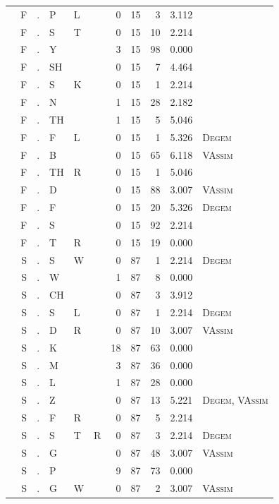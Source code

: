 \documentclass[12pt]{article}
\begin{document}
\begin{longtable}{r@{ } r@{ } c@{ } l@{ } l@{ } l@{ } r r r r l }
 & F & . & P & L &  & 0 & 15 & 3 & 3.112 &  \\
 & F & . & S & T &  & 0 & 15 & 10 & 2.214 &  \\
 & F & . & Y &  &  & 3 & 15 & 98 & 0.000 &  \\
 & F & . & SH &  &  & 0 & 15 & 7 & 4.464 &  \\
 & F & . & S & K &  & 0 & 15 & 1 & 2.214 &  \\
 & F & . & N &  &  & 1 & 15 & 28 & 2.182 &  \\
 & F & . & TH &  &  & 1 & 15 & 5 & 5.046 &  \\
 & F & . & F & L &  & 0 & 15 & 1 & 5.326 & \textsc{Degem} \\
 & F & . & B &  &  & 0 & 15 & 65 & 6.118 & \textsc{VAssim} \\
 & F & . & TH & R &  & 0 & 15 & 1 & 5.046 &  \\
 & F & . & D &  &  & 0 & 15 & 88 & 3.007 & \textsc{VAssim} \\
 & F & . & F &  &  & 0 & 15 & 20 & 5.326 & \textsc{Degem} \\
 & F & . & S &  &  & 0 & 15 & 92 & 2.214 &  \\
 & F & . & T & R &  & 0 & 15 & 19 & 0.000 &  \\
 & S & . & S & W &  & 0 & 87 & 1 & 2.214 & \textsc{Degem} \\
 & S & . & W &  &  & 1 & 87 & 8 & 0.000 &  \\
 & S & . & CH &  &  & 0 & 87 & 3 & 3.912 &  \\
 & S & . & S & L &  & 0 & 87 & 1 & 2.214 & \textsc{Degem} \\
 & S & . & D & R &  & 0 & 87 & 10 & 3.007 & \textsc{VAssim} \\
 & S & . & K &  &  & 18 & 87 & 63 & 0.000 &  \\
 & S & . & M &  &  & 3 & 87 & 36 & 0.000 &  \\
 & S & . & L &  &  & 1 & 87 & 28 & 0.000 &  \\
 & S & . & Z &  &  & 0 & 87 & 13 & 5.221 & \textsc{Degem}, \textsc{VAssim} \\
 & S & . & F & R &  & 0 & 87 & 5 & 2.214 &  \\
 & S & . & S & T & R & 0 & 87 & 3 & 2.214 & \textsc{Degem} \\
 & S & . & G &  &  & 0 & 87 & 48 & 3.007 & \textsc{VAssim} \\
 & S & . & P &  &  & 9 & 87 & 73 & 0.000 &  \\
 & S & . & G & W &  & 0 & 87 & 2 & 3.007 & \textsc{VAssim} \\

\end{longtable}
\end{document}
